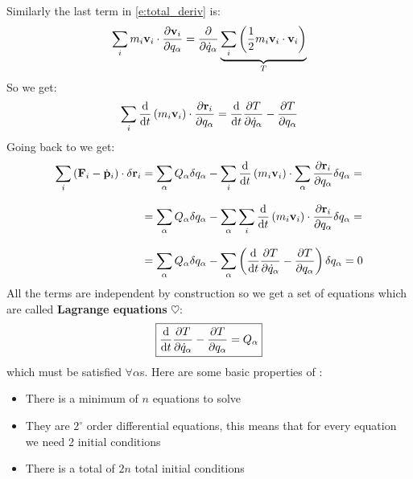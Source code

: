 Similarly the last term in \eqref{e:total_deriv} is:
\begin{equation}
    \displaystyle\sum_im_i\vb{v}_i \cdot \dfrac{\partial \vb{v}_i}{\partial q_{\alpha}} = \dfrac{\partial }{\partial \dot{q}_{\alpha}} \underbrace{\displaystyle\sum_i \left(\dfrac{1}{2}m_i \vb{v}_i \cdot \vb{v}_i\right)}_{T}
\end{equation}
So we get:
\begin{equation}
    \bigsum_i \dv{}{t}\brackets{m_i\vec{v}_i}\cdot \dfrac{\partial \vec{r}_i}{\partial q_{\alpha}} = \dv{}{t}\dfrac{\partial T}{\partial \dot{q}_{\alpha}} - \dfrac{\partial T}{\partial q_{\alpha}}
\end{equation}
Going back to \dalembertref\;we get:
\begin{equation}
    \begin{split}
      \bigsum_i \brackets{\vec{F}_i - \dvec{p}_i} \cdot \delta \vec{r}_i &= \bigsum_{\alpha}Q_{\alpha}\delta q_{\alpha} - \bigsum_i \dv{}{t}\brackets{m_i\vec{v}_i} \cdot \bigsum_{\alpha}\dfrac{\partial \vec{r}_i}{\partial q_{\alpha}}\delta q_{\alpha} = \\[8pt]
      &= \bigsum_{\alpha}Q_{\alpha}\delta q_{\alpha} - \bigsum_{\alpha}\bigsum_i \dv{}{t}\brackets{m_i\vec{v}_i} \cdot \dfrac{\partial \vec{r}_i}{\partial q_{\alpha}}\delta q_{\alpha} = \\[8pt]
      &= \bigsum_{\alpha}Q_{\alpha}\delta q_{\alpha} - \bigsum_{\alpha}\brackets{\dv{}{t}\dfrac{\partial T}{\partial \dot{q}_{\alpha}} - \dfrac{\partial T}{\partial q_{\alpha}}}\delta q_{\alpha} = 0
    \end{split}
\end{equation}
All the terms are independent by construction so we get a set of equations which are called \textbf{Lagrange equations} $\heartsuit$:
\begin{equation} \label{Lagrange_equations}
    \boxed{\dv{}{t}\dfrac{\partial T}{\partial \dot{q}_{\alpha}} - \dfrac{\partial T}{\partial q_{\alpha}} = Q_{\alpha}}
\end{equation}
which must be satisfied $\forall \alpha$s.
Here are some basic properties of \lagrangeref :
\begin{itemize}
    \item There is a minimum of $n$ equations to solve
    \item They are $2^\circ$ order differential equations, this means that for every equation we need 2 initial conditions
    \item There is a total of $2n$ total initial conditions
\end{itemize}
